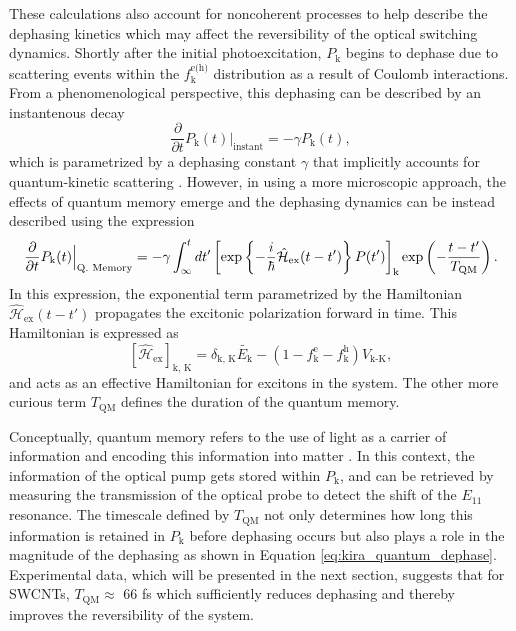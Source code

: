 These calculations also account for noncoherent processes to help describe the dephasing kinetics which may affect the reversibility of the optical switching dynamics. Shortly after the initial photoexcitation, $P_\text{k}$ begins to dephase due to scattering events within the $f_\text{k}^\text{e(h)}$ distribution as a result of Coulomb interactions. From a phenomenological perspective, this dephasing can be described by an instantenous decay
\begin{equation}
	\dfrac{\partial}{\partial t} P_\text{k}(t) \Big|_\text{instant} = -\gamma P_\text{k}(t),
\end{equation}
which is parametrized by a dephasing constant $\gamma$ that implicitly accounts for quantum-kinetic scattering \cite{smith2010extraction, kira2011semiconductor}. However, in using a more microscopic approach, the effects of quantum memory emerge and the dephasing dynamics can be instead described using the expression
%
\begin{equation}\label{eq:kira_phenom_dephase}
	\dfrac{\partial}{\partial t} P_\text{k}(t) \Big|_\text{Q. Memory} = -\gamma \int^{t}_{\infty} dt' \left[ \exp\left\{ - \frac{\small i}{ \small \hbar} \hat{\mathcal{H}}_\text{ex}(t-t') \right\} P(t') \right]_\text{k} \exp \left(- \frac{t-t'}{T_\text{QM}} \right).
\end{equation}
%
In this expression, the exponential term parametrized by the Hamiltonian $\hat{\mathcal{H}}_\text{ex}(t-t')$ propagates the excitonic polarization forward in time. This Hamiltonian is expressed as
%
\begin{equation}
	\left[ \hat{\mathcal{H}}_\text{ex} \right]_\text{k, K}= \delta_\text{k, K} \tilde{E_\text{k}} - (1 - f_\text{k}^\text{e} - f_\text{k}^\text{h}) V_\text{k-K},
  \label{eq:kira_quantum_dephase}
\end{equation}
%
and acts as an effective Hamiltonian for excitons in the system. The other more curious term $T_\text{QM}$ defines the duration of the quantum memory.

Conceptually, quantum memory refers to the use of light as a carrier of information and encoding this information into matter \cite{iakoupov2013efficient}. In this context, the information of the optical pump gets stored within $P_\text{k}$, and can be retrieved by measuring the transmission of the optical probe to detect the shift of the $E_{11}$ resonance. The timescale defined by $T_\text{QM}$ not only determines how long this information is retained in $P_\text{k}$ before dephasing occurs but also plays a role in the magnitude of the dephasing as shown in Equation \eqref{eq:kira_quantum_dephase}. Experimental data, which will be presented in the next section, suggests that for SWCNTs, $T_\text{QM} \approx $ 66 fs which sufficiently reduces dephasing and thereby improves the reversibility of the system.

